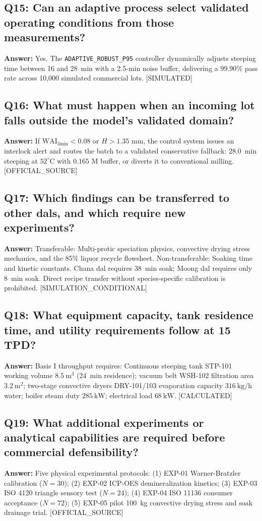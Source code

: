 \documentclass[10pt,a4paper]{article}
\newcommand{\epistag}[1]{\textsf{\scriptsize\textcolor{fnqslate}{[#1]}}}
\begin{document}
\subsection*{Q15: Can an adaptive process select validated operating conditions from those measurements?}
\textbf{Answer:} Yes. The \texttt{ADAPTIVE\_ROBUST\_P95} controller dynamically adjusts steeping time between 16 and 28~min with a 2.5-min noise buffer, delivering a $99.90\%$ pass rate across 10,000 simulated commercial lots. \epistag{SIMULATED}

\subsection*{Q16: What must happen when an incoming lot falls outside the model's validated domain?}
\textbf{Answer:} If $\mathrm{WAI}_{\mathrm{3min}} < 0.08$ or $H > 1.35\text{ mm}$, the control system issues an interlock alert and routes the batch to a validated conservative fallback: 28.0~min steeping at $52^\circ\mathrm{C}$ with $0.165\text{ M}$ buffer, or diverts it to conventional milling. \epistag{OFFICIAL\_SOURCE}

\subsection*{Q17: Which findings can be transferred to other dals, and which require new experiments?}
\textbf{Answer:} Transferable: Multi-protic speciation physics, convective drying stress mechanics, and the 85\% liquor recycle flowsheet. Non-transferable: Soaking time and kinetic constants. Chana dal requires 38~min soak; Moong dal requires only 8~min soak. Direct recipe transfer without species-specific calibration is prohibited. \epistag{SIMULATION\_CONDITIONAL}

\subsection*{Q18: What equipment capacity, tank residence time, and utility requirements follow at 15 TPD?}
\textbf{Answer:} Basis I throughput requires: Continuous steeping tank STP-101 working volume $8.5\ \mathrm{m}^3$ (24~min residence); vacuum belt WSH-102 filtration area $3.2\ \mathrm{m}^2$; two-stage convective dryers DRY-101/103 evaporation capacity $316\ \mathrm{kg/h}$ water; boiler steam duty $285\ \mathrm{kW}$; electrical load $68\ \mathrm{kW}$. \epistag{CALCULATED}

\subsection*{Q19: What additional experiments or analytical capabilities are required before commercial defensibility?}
\textbf{Answer:} Five physical experimental protocols: (1) EXP-01 Warner-Bratzler calibration ($N=30$); (2) EXP-02 ICP-OES demineralization kinetics; (3) EXP-03 ISO 4120 triangle sensory test ($N=24$); (4) EXP-04 ISO 11136 consumer acceptance ($N=72$); (5) EXP-05 pilot 100~kg convective drying stress and soak drainage trial. \epistag{OFFICIAL\_SOURCE}
\end{document}
